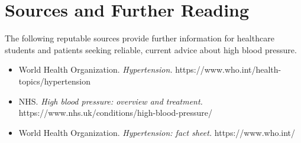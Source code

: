 \section*{Sources and Further Reading}
The following reputable sources provide further information for healthcare students and patients seeking reliable, current advice about high blood pressure.

\begin{itemize}
    \item World Health Organization. \textit{Hypertension.} https://www.who.int/health-topics/hypertension
    \item NHS. \textit{High blood pressure: overview and treatment.} https://www.nhs.uk/conditions/high-blood-pressure/
    \item World Health Organization. \textit{Hypertension: fact sheet.} https://www.who.int/
\end{itemize}
